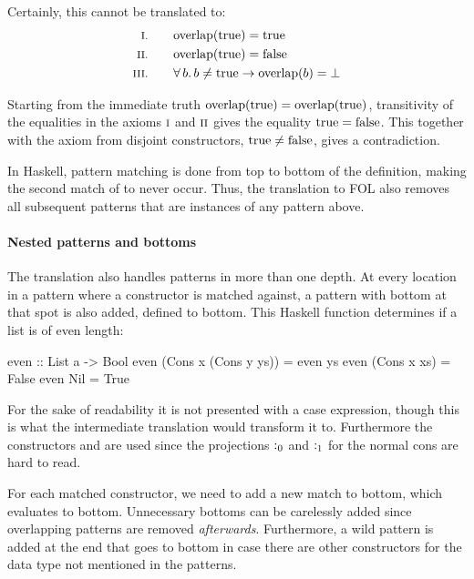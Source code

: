 Certainly, this cannot be translated to:
\begin{align*}
\rom{1} \qquad & \fn{overlap}(\fn{true}) = \fn{true} \\
\rom{2} \qquad & \fn{overlap}(\fn{true}) = \fn{false} \\
\rom{3} \qquad & \fa{b} b \neq \fn{true} \rightarrow \fn{overlap}(b) = \bot
\end{align*}

Starting from the immediate truth $\mathrm{overlap}(\mathrm{true}) =
\mathrm{overlap}(\mathrm{true})$, transitivity of the equalities in the axioms
$\romnodot{1}$ and $\romnodot{2}$ gives the equality $\mathrm{true} =
\mathrm{false}$. This together with the axiom from disjoint constructors,
$\mathrm{true} \neq \mathrm{false}$, gives a contradiction.

In Haskell, pattern matching is done from top to bottom of the
definition, making the second match of  to never occur. Thus,
the translation to FOL also removes all subsequent patterns that are
instances of any pattern above.

\paragraph{Nested patterns and bottoms} The translation also handles
patterns in more than one depth. At every location in a pattern where
a constructor is matched against, a pattern with bottom at that spot
is also added, defined to bottom. This Haskell function 
determines if a list is of even length:

\begin{code}
even :: List a -> Bool
even (Cons x (Cons y ys)) = even ys
even (Cons x xs)          = False
even Nil                  = True
\end{code}

\noindent
For the sake of readability it is not presented with a case
expression, though this is what the intermediate translation would
transform it to. Furthermore the constructors  and 
are used since the projections $\mathrm{:_0}$ and $\mathrm{:_1}$ for the
normal cons are hard to read.

For each matched constructor, we need to add a new match to bottom,
which evaluates to bottom. Unnecessary bottoms can be carelessly added
since overlapping patterns are removed \emph{afterwards}. Furthermore,
a wild pattern is added at the end that goes to bottom in case there
are other constructors for the data type not mentioned in the
patterns.

